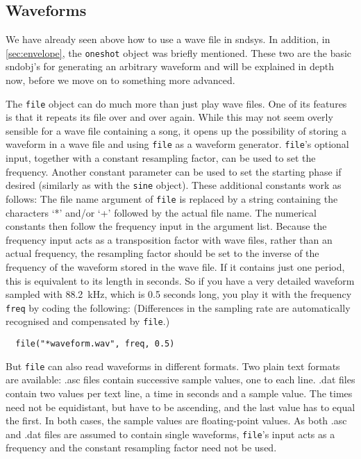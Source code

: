 \documentclass{article}
\def\sn{{\sc sndsys}}
\def\bv{\begin{verbatim}}
\begin{document}
\subsection{Waveforms}
\label{sec:multiwave}

We have already seen above how to use a wave file in \sn.  In addition, in
\autoref{sec:envelope}, the {\tt oneshot} object was briefly mentioned.  These
two are the basic sndobj's for generating an arbitrary waveform and will be
explained in depth now, before we move on to something more advanced.

The {\tt file} object can do much more than just play wave files.  One of its
features is that it repeats its file over and over again.  While this may not
seem overly sensible for a wave file containing a song, it opens up the
possibility of storing a waveform in a wave file and using {\tt file} as a
waveform generator.  {\tt file}'s optional input, together with a constant
resampling factor, can be used to set the frequency.  Another constant
parameter can be used to set the starting phase if desired (similarly as with
the {\tt sine} object).  These additional constants work as follows: The file
name argument of {\tt file} is replaced by a string containing the characters
`*' and/or `+' followed by the actual file name.  The numerical constants then
follow the frequency input in the argument list.  Because the frequency input
acts as a transposition factor with wave files, rather than an actual
frequency, the resampling factor should be set to the inverse of the frequency
of the waveform stored in the wave file.  If it contains just one period, this
is equivalent to its length in seconds.  So if you have a very detailed
waveform sampled with 88.2~kHz, which is 0.5 seconds long, you play it with the
frequency {\tt freq} by coding the following: (Differences in the sampling rate
are automatically recognised and compensated by {\tt file}.)

\bv
  file("*waveform.wav", freq, 0.5)
\end{verbatim}

But {\tt file} can also read waveforms in different formats.  Two plain text
formats are available: .asc files contain successive sample values, one to each
line.  .dat files contain two values per text line, a time in seconds and a
sample value.  The times need not be equidistant, but have to be ascending, and
the last value has to equal the first.  In both cases, the sample values are
floating-point values.  As both .asc and .dat files are assumed to contain
single waveforms, {\tt file}'s input acts as a frequency and the constant
resampling factor need not be used.
\end{document}
